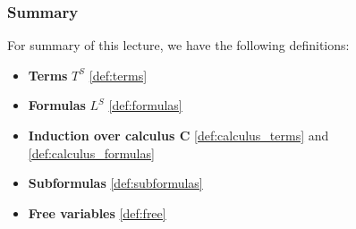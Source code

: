 \begin{frame}
    \frametitle{Summary}

    For summary of this lecture, we have the following definitions:
    \begin{itemize}
        \item \textbf{Terms} $T^S$ \ref{def:terms}
        \item \textbf{Formulas} $L^S$ \ref{def:formulas}
        \item \textbf{Induction over calculus $\mathbf{C}$} \ref{def:calculus_terms} and \ref{def:calculus_formulas}
        \item \textbf{Subformulas} \ref{def:subformulas}
        \item \textbf{Free variables} \ref{def:free}
    \end{itemize}
    
\end{frame}
